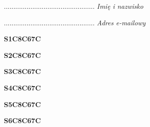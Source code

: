\begin{turn}{90}\begin{minipage}{\linewidth} \vspace{20mm} ................................................  \textit{Imię i nazwisko}\end{minipage}\end{turn}

\begin{turn}{90}\begin{minipage}{\linewidth} \vspace{20mm} ................................................  \textit{Adres e-mailowy}\end{minipage}\end{turn}

\begin{turn}{90}\huge \begin{minipage}{\linewidth} \vspace{10mm}\textbf{S1C8C67C}\end{minipage}\end{turn}

\begin{turn}{90}\huge \begin{minipage}{\linewidth} \vspace{10mm}\textbf{S2C8C67C}\end{minipage}\end{turn}

\begin{turn}{90}\huge \begin{minipage}{\linewidth} \vspace{10mm}\textbf{S3C8C67C}\end{minipage}\end{turn}

\begin{turn}{90}\huge \begin{minipage}{\linewidth} \vspace{10mm}\textbf{S4C8C67C}\end{minipage}\end{turn}

\begin{turn}{90}\huge \begin{minipage}{\linewidth} \vspace{10mm}\textbf{S5C8C67C}\end{minipage}\end{turn}

\begin{turn}{90}\huge \begin{minipage}{\linewidth} \vspace{10mm}\textbf{S6C8C67C}\end{minipage}\end{turn}

